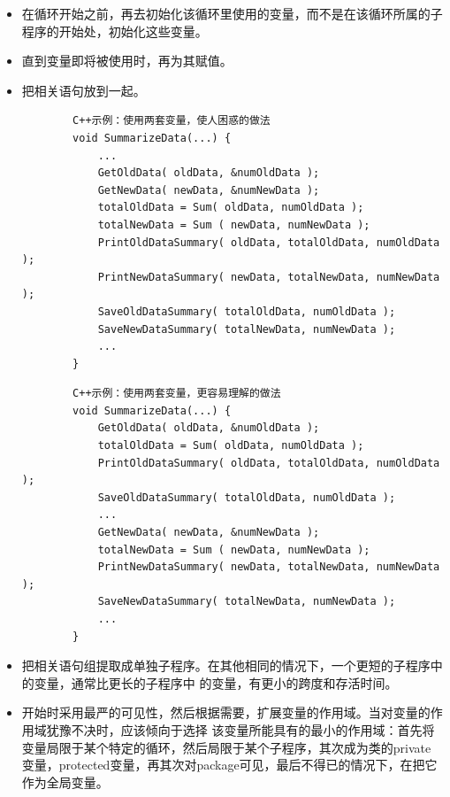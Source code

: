 \documentclass{article}
\begin{document}
\begin{itemize}
    \item 在循环开始之前，再去初始化该循环里使用的变量，而不是在该循环所属的子程序的开始处，初始化这些变量。
    \item 直到变量即将被使用时，再为其赋值。
    \item 把相关语句放到一起。
    \begin{lstlisting}
        C++示例：使用两套变量，使人困惑的做法
        void SummarizeData(...) {
            ...
            GetOldData( oldData, &numOldData );
            GetNewData( newData, &numNewData );
            totalOldData = Sum( oldData, numOldData );
            totalNewData = Sum ( newData, numNewData );
            PrintOldDataSummary( oldData, totalOldData, numOldData );
            PrintNewDataSummary( newData, totalNewData, numNewData );
            SaveOldDataSummary( totalOldData, numOldData );
            SaveNewDataSummary( totalNewData, numNewData );
            ...
        }
    \end{lstlisting}
    \begin{lstlisting}
        C++示例：使用两套变量，更容易理解的做法
        void SummarizeData(...) {
            GetOldData( oldData, &numOldData );
            totalOldData = Sum( oldData, numOldData );
            PrintOldDataSummary( oldData, totalOldData, numOldData );
            SaveOldDataSummary( totalOldData, numOldData );
            ...
            GetNewData( newData, &numNewData );
            totalNewData = Sum ( newData, numNewData );
            PrintNewDataSummary( newData, totalNewData, numNewData );
            SaveNewDataSummary( totalNewData, numNewData );
            ...
        }
    \end{lstlisting}
    \item 把相关语句组提取成单独子程序。在其他相同的情况下，一个更短的子程序中的变量，通常比更长的子程序中
    的变量，有更小的跨度和存活时间。
    \item 开始时采用最严的可见性，然后根据需要，扩展变量的作用域。当对变量的作用域犹豫不决时，应该倾向于选择
    该变量所能具有的最小的作用域：首先将变量局限于某个特定的循环，然后局限于某个子程序，其次成为类的private
    变量，protected变量，再其次对package可见，最后不得已的情况下，在把它作为全局变量。
\end{itemize}
\end{document}
